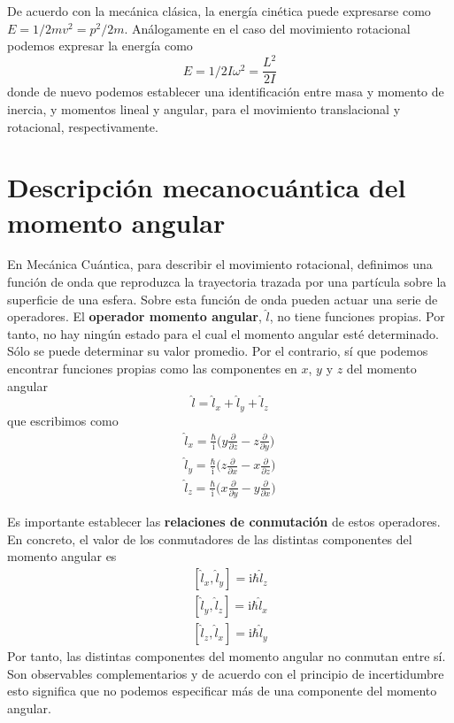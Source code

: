 \documentclass{tufte-handout}
\begin{document}
De acuerdo con la mecánica clásica, la energía cinética 
puede expresarse como $E=1/2mv^2=p^2/2m$. Análogamente en 
el caso del movimiento rotacional podemos expresar la 
energía como 
\begin{equation}
    E=1/2I\omega^2=\frac{L^2}{2I}\label{eq:classicrote}
\end{equation}
donde de nuevo podemos establecer una identificación 
entre masa y momento de inercia, y momentos lineal y
angular, para el movimiento translacional y rotacional,
respectivamente.

\section{Descripción mecanocuántica del momento angular}
En Mecánica Cuántica, para describir el movimiento 
rotacional, definimos una función de onda que reproduzca 
la trayectoria trazada por una partícula sobre la superficie
de una esfera. Sobre esta función de onda pueden actuar
una serie de operadores. El \textbf{operador momento
angular}, $\hat{l}$, no tiene funciones propias. Por tanto,
no hay ningún estado para el cual el momento angular 
esté determinado. Sólo se puede determinar su valor
promedio. Por el contrario, sí que podemos encontrar
funciones propias como las componentes en $x$, $y$ y
$z$ del momento angular
\begin{equation}
\hat{l}=\hat{l}_x+\hat{l}_y+\hat{l}_z
\end{equation}
que escribimos como
\begin{subequations}
    \begin{align}
\hat{l}_x = 
\frac{\hbar}{\mathrm{i}}\bigg(y\frac{\partial}{\partial z} 
- z\frac{\partial}{\partial y}\bigg) \\
\hat{l}_y = 
\frac{\hbar}{\mathrm{i}}\bigg(z\frac{\partial}{\partial x}
-  x\frac{\partial}{\partial z}\bigg) \\
\hat{l}_z = 
\frac{\hbar}{\mathrm{i}}\bigg(x\frac{\partial}{\partial y} 
- y\frac{\partial}{\partial x}\bigg) 
\end{align}
\end{subequations}

Es importante establecer las \textbf{relaciones de
conmutación} de estos operadores. En concreto, el valor 
de los conmutadores de las distintas componentes del 
momento angular es 
\begin{subequations}
    \begin{align}
        [\hat{l}_x,\hat{l}_y] = \mathrm{i}\hbar \hat{l}_z\\
        [\hat{l}_y,\hat{l}_z] = \mathrm{i}\hbar \hat{l}_x\\
        [\hat{l}_z,\hat{l}_x] = \mathrm{i}\hbar \hat{l}_y
    \end{align}
\end{subequations}
Por tanto, las distintas componentes del momento angular no
conmutan entre sí. Son observables complementarios y
de acuerdo con el principio de incertidumbre esto significa
que no podemos especificar más de una componente del momento
angular.
\end{document}
